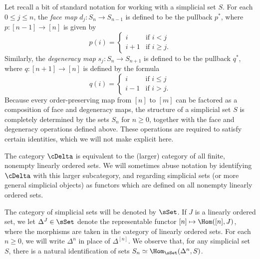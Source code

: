 Let recall a bit of standard notation for working with a
simplicial set $S$. For each $0 \leq j \leq n$, the {\it face map}
$d_j: S_n \rightarrow S_{n-1}$ is defined to
be the pullback $p^{\ast}$, where $p: [n-1] \rightarrow [n]$ is given by
$$p(i) =
\begin{cases} i & \text{if } i<j \\
i+1 & \text{if } i \geq j. \end{cases} $$ 
Similarly, the {\it degeneracy map} $s_j: S_{n} \rightarrow S_{n+1}$
is defined to be the pullback $q^{\ast}$, where $q: [n+1] \rightarrow [n]$ is defined by the formula
$$q(i) = \begin{cases} i & \text{if } i \leq j \\
i-1 & \text{if } i > j. \end{cases}$$
Because every order-preserving map from 
$[n]$ to $[m]$ can be factored as a composition of face and degeneracy maps, 
the structure of a simplicial set $S$ is completely determined by the sets
$S_n$ for $n \geq 0$, together with the face and degeneracy operations
defined above. These operations are required to satisfy certain identities, which we will not make explicit here.

\begin{remark}
The category $\cDelta$ is equivalent to the (larger) category of all finite, nonempty linearly ordered sets. We will sometimes abuse notation by identifying $\cDelta$ with this larger subcategory, and regarding simplicial sets (or more general simplicial objects) as functors which are defined on all nonempty linearly ordered sets.
\end{remark}

\begin{notation}
The category of simplicial sets will be denoted by $\sSet$.
If $J$ is a linearly ordered set, we let $\Delta^J \in \sSet$ denote the
representable functor 
$[n] \mapsto \Hom( [n], J)$, where the morphisms are taken in the category of linearly ordered sets. For each $n \geq 0$, we will write
$\Delta^{n}$ in place of $\Delta^{[n]}$. We observe that, for any simplicial set $S$, there
is a natural identification of sets $S_{n} \simeq \Hom_{\sSet}(\Delta^n, S)$.
\end{notation}

